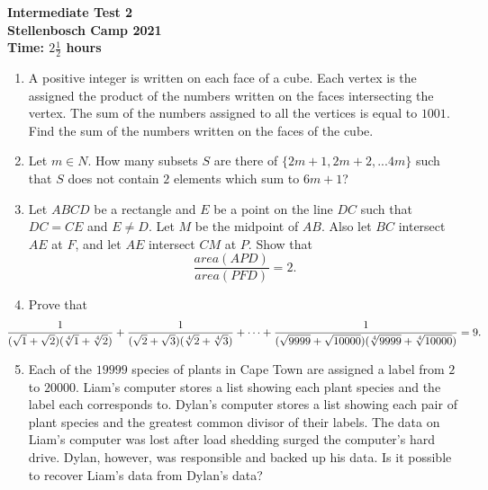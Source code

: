 \documentclass{article}
\begin{document}
\thispagestyle{empty}

\begin{center}
  \textbf{\Large Intermediate Test 2}
  \\ \vspace{1em}
  \textbf{\large Stellenbosch Camp 2021}
  \\ \vspace{1em}
  \textbf{\large Time: $2\frac{1}{2}$ hours}
\end{center}

\bigskip

\begin{enumerate}[itemsep=\fill]


\item %
A positive integer is written on each face of a cube. Each vertex is the assigned the product of the numbers written on the faces intersecting the vertex. The sum of the numbers assigned to all the vertices is equal to $1001$. Find the sum of the numbers written on the faces of the cube.


\item %
Let $m \in {N}$. How many subsets $S$ are there of $\{2m+1,2m+2,...4m\}$ such that $S$ does not contain $2$ elements which sum to $6m+1$? 


\item %
Let $ABCD$ be a rectangle and $E$ be a point on the line $DC$ such that $DC = CE$ and $E \neq D$.  Let $M$ be the midpoint of $AB$.  Also let $BC$ intersect $AE$ at $F$, and let $AE$ intersect $CM$ at $P$.  Show that $$\frac{area(APD)}{area(PFD)} = 2.$$


\item %
Prove that
\[ \mspace{-36mu} \frac{1}{(\sqrt{1}+\sqrt{2})(\sqrt[4]{1}+\sqrt[4]{2})} +\frac{1}{(\sqrt{2}+\sqrt{3})(\sqrt[4]{2}+\sqrt[4]{3})} +\dotsb +\frac{1}{(\sqrt{9999}+\sqrt{10000})(\sqrt[4]{9999}+\sqrt[4]{10000})} = 9. \]


\item %
Each of the $19 999$ species of plants in Cape Town are assigned a label from $2$ to $20 000$. Liam's computer stores a list showing each plant species and the label each corresponds to. Dylan's computer stores a list showing each pair of plant species and the greatest common divisor of their labels. The data on Liam's computer was lost after load shedding surged the computer's hard drive. Dylan, however, was responsible and backed up his data. Is it possible to recover Liam's data from Dylan's data?

\end{enumerate}
\end{document}
